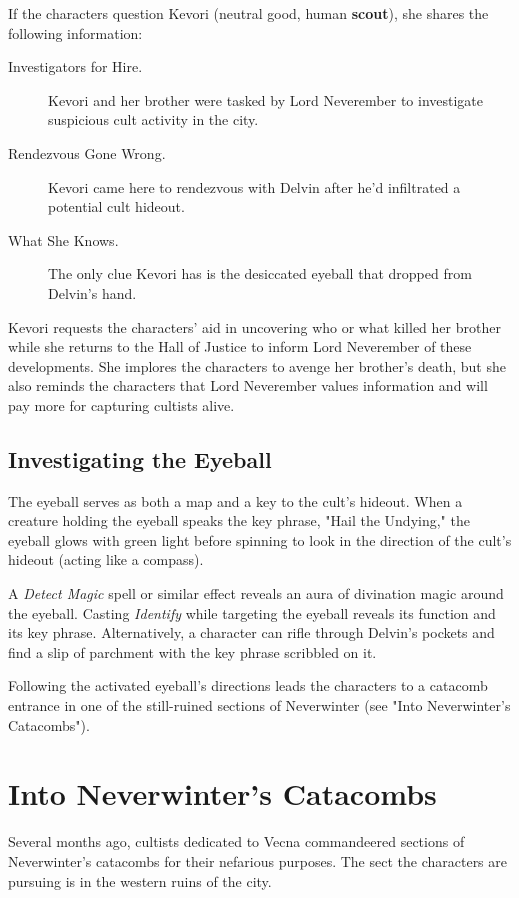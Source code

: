 \documentclass[10pt,a4paper,twoside,fancy,bg=print,twocolumn,openany,nodeprecatedcode]{dndbook}
\begin{document}
If the characters question Kevori (neutral good, human \textbf{scout}), she shares the following information:

\begin{description}
  \item[Investigators for Hire.]
  Kevori and her brother were tasked by Lord Neverember to investigate suspicious cult activity in the city.
  
  \item[Rendezvous Gone Wrong.]
  Kevori came here to rendezvous with Delvin after he'd infiltrated a potential cult hideout.
  
  \item[What She Knows.]
  The only clue Kevori has is the desiccated eyeball that dropped from Delvin's hand.
\end{description}

Kevori requests the characters' aid in uncovering who or what killed her brother while she returns to the Hall of Justice to inform Lord Neverember of these developments. She implores the characters to avenge her brother's death, but she also reminds the characters that Lord Neverember values information and will pay more for capturing cultists alive.

\subsection{Investigating the Eyeball}
The eyeball serves as both a map and a key to the cult's hideout. When a creature holding the eyeball speaks the key phrase, "Hail the Undying," the eyeball glows with green light before spinning to look in the direction of the cult's hideout (acting like a compass).

A \textit{Detect Magic} spell or similar effect reveals an aura of divination magic around the eyeball. Casting \textit{Identify} while targeting the eyeball reveals its function and its key phrase. Alternatively, a character can rifle through Delvin's pockets and find a slip of parchment with the key phrase scribbled on it.

Following the activated eyeball's directions leads the characters to a catacomb entrance in one of the still-ruined sections of Neverwinter (see "Into Neverwinter's Catacombs").

\section{Into Neverwinter's Catacombs}
Several months ago, cultists dedicated to Vecna commandeered sections of Neverwinter's catacombs for their nefarious purposes. The sect the characters are pursuing is in the western ruins of the city.
\end{document}
